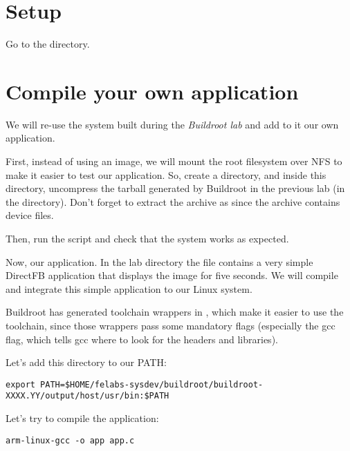 
\section{Setup}

Go to the  directory.

\section{Compile your own application}

We will re-use the system built during the {\em Buildroot lab} and add
to it our own application.

First, instead of using an  image, we will mount the root
filesystem over NFS to make it easier to test our application. So,
create a  directory, and inside this directory,
uncompress the tarball generated by Buildroot in the previous lab (in
the  directory). Don't forget to extract the
archive as  since the archive contains device files.

Then, run the  script and check that the system works
as expected.

Now, our application. In the lab directory the file 
contains a very simple DirectFB application that displays the
 image for five seconds. We will compile and
integrate this simple application to our Linux system.

Buildroot has generated toolchain wrappers in
, which make it easier to use the toolchain,
since those wrappers pass some mandatory flags (especially the
 gcc flag, which tells gcc where to look for the
headers and libraries).

Let's add this directory to our PATH:

\footnotesize
\begin{verbatim}
export PATH=$HOME/felabs-sysdev/buildroot/buildroot-XXXX.YY/output/host/usr/bin:$PATH
\end{verbatim}
\normalsize

Let's try to compile the application:

\begin{verbatim}
arm-linux-gcc -o app app.c
\end{verbatim}

